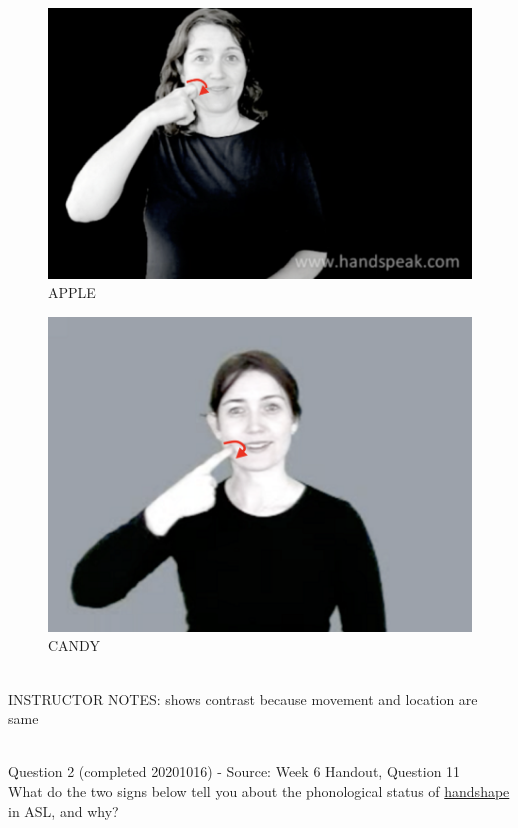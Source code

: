 \documentclass[12pt]{article}
\begin{document}
\begin{figure}[H]
\includegraphics{../images/asl_apple.png}
\caption{APPLE}
\end{figure}
\begin{figure}[H]
\includegraphics{../images/asl_candy.png}
\caption{CANDY}
\end{figure}

~\\
INSTRUCTOR NOTES: shows contrast because movement and location are same


~\\

{\large Question 2} (completed 20201016) - Source: Week 6 Handout, Question 11\\

What do the two signs below tell you about the phonological status of \underline{handshape} in ASL, and why?\\
\end{document}
